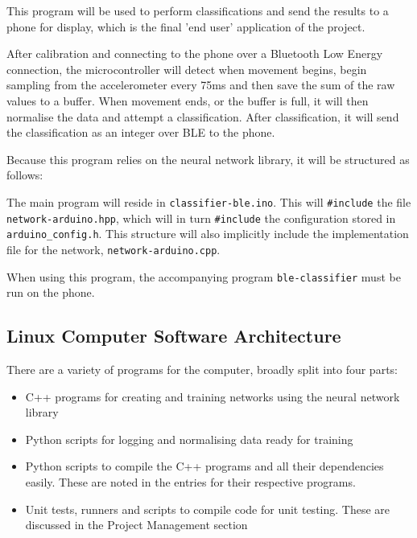 \documentclass[a4paper]{article}
\begin{document}
This program will be used to perform classifications and send the results to a phone for display, which is the final 'end user' application of the project.

After calibration and connecting to the phone over a Bluetooth Low Energy connection, the microcontroller will detect when movement begins, begin sampling from the accelerometer every 75ms and then save the sum of the raw values to a buffer. When movement ends, or the buffer is full, it will then normalise the data and attempt a classification. After classification, it will send the classification as an integer over BLE to the phone.

Because this program relies on the neural network library, it will be structured as follows:

The main program will reside in \lstinline{classifier-ble.ino}. This will \lstinline{#include} the file \lstinline{network-arduino.hpp}, which will in turn \lstinline{#include} the configuration stored in \lstinline{arduino_config.h}. 
This structure will also implicitly include the implementation file for the network, \lstinline{network-arduino.cpp}.


When using this program, the accompanying program \lstinline{ble-classifier} must be run on the phone. 

\subsection{Linux Computer Software Architecture}%

There are a variety of programs for the computer, broadly split into four parts:

\begin{itemize}
\item C++ programs for creating and training networks using the neural network library
\item Python scripts for logging and normalising data ready for training
\item Python scripts to compile the C++ programs and all their dependencies easily. These are noted in the entries for their respective programs.
\item Unit tests, runners and scripts to compile code for unit testing. These are discussed in the Project Management section 
\end{itemize}
\end{document}
